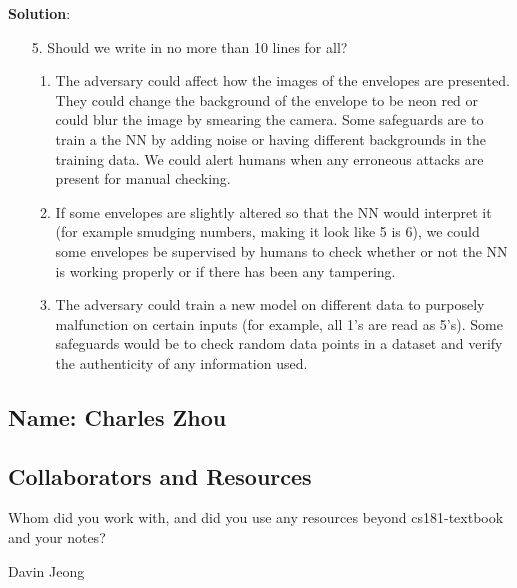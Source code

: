 \documentclass[submit]{../harvardml}
\newenvironment{answer}{
    \vspace{2mm}
    \color{blue}\noindent\textbf{Solution}:
}{}
\begin{document}
\begin{answer}
\begin{enumerate}
    \item[5.]
    Should we write in no more than 10 lines for all?
        

      \begin{enumerate}
        \item The adversary could affect how the images of the envelopes are presented. They could change the background of the envelope to be neon red or could blur the image by smearing the camera. Some safeguards are to train a the NN by adding noise or having different backgrounds in the training data. We could alert humans when any erroneous attacks are present for manual checking.
        \item If some envelopes are slightly altered so that the NN would interpret it (for example smudging numbers, making it look like 5 is 6), we could some envelopes be supervised by humans to check whether or not the NN is working properly or if there has been any tampering.
        \item The adversary could train a new model on different data to purposely malfunction on certain inputs (for example, all 1's are read as 5's). Some safeguards would be to check random data points in a dataset and verify the authenticity of any information used.
      \end{enumerate}


  \end{enumerate}

\end{answer}


\newpage
\subsection*{Name: Charles Zhou} 

\subsection*{Collaborators and Resources}
Whom did you work with, and did you use any resources beyond cs181-textbook and your notes?

Davin Jeong
\end{document}

